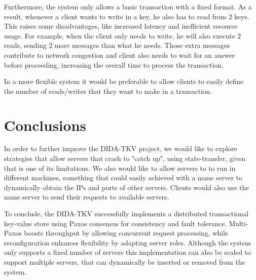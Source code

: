 \documentclass[times, 10pt,twocolumn]{article}
\begin{document}
Furthermore, the system only allows a basic transaction with a fixed format. As a result, whenever a client wants to write in a key, he also has to read from 2 keys. This raises some disadvantages, like increased latency and inefficient resource usage. For example, when the client only needs to write, he will also execute 2 reads, sending 2 more messages than what he needs. Those extra messages contribute to network congestion and client also needs to wait for an answer before proceeding, increasing the overall time to process the transaction.

In a more flexible system it would be preferable to allow clients to easily define the number of reads/writes that they want to make in a transaction.
\section{Conclusions}

In order to further improve the DIDA-TKV project, we would like to explore strategies that allow servers that crash to "catch up", using state-transfer, given that is one of its limitations. We also would like to allow servers to to run in different machines, something that could easily achieved with a name server to dynamically obtain the IPs and ports of other servers. Clients would also use the name server to send their requests to available servers.

To conclude, the DIDA-TKV successfully implements a distributed transactional key-value store using Paxos consensus for consistency and fault tolerance. Multi-Paxos boosts throughput by allowing concurrent request processing, while reconfiguration enhances flexibility by adapting server roles. Although the system only supports a fixed number of servers this implementation can also be scaled to support multiple servers, that can dynamically be inserted or removed from the system.


\nocite{ex1,ex2}


\end{document}
